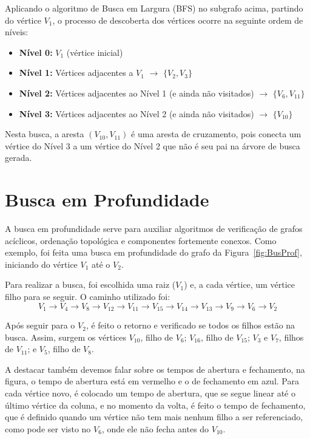 Aplicando o algoritmo de Busca em Largura (BFS) no subgrafo acima, partindo do vértice $V_1$, o processo de descoberta dos vértices ocorre na seguinte ordem de níveis:

\begin{itemize}
    \item \textbf{Nível 0:} $V_{1}$ (vértice inicial)
    \item \textbf{Nível 1:} Vértices adjacentes a $V_{1}$ $\rightarrow$ $\{V_{2}, V_{3}\}$
    \item \textbf{Nível 2:} Vértices adjacentes ao Nível 1 (e ainda não visitados) $\rightarrow$ $\{V_{6}, V_{11}\}$
    \item \textbf{Nível 3:} Vértices adjacentes ao Nível 2 (e ainda não visitados) $\rightarrow$ $\{V_{10}\}$
\end{itemize}

Nesta busca, a aresta $(V_{10}, V_{11})$ é uma aresta de cruzamento, pois conecta um vértice do Nível 3 a um vértice do Nível 2 que não é seu pai na árvore de busca gerada.


    \section{Busca em Profundidade}\label{sec:buscaProf}
A busca em profundidade serve para auxiliar algoritmos de verificação de grafos acíclicos, ordenação topológica e componentes fortemente conexos.
Como exemplo, foi feita uma busca em profundidade do grafo da Figura~\ref{fig:BusProf}, iniciando do vértice $V_1$ até o $V_2$.

Para realizar a busca, foi escolhida uma raiz ($V_1$) e, a cada vértice, um vértice filho para se seguir.
O caminho utilizado foi:
\[
V_1 \rightarrow V_4 \rightarrow V_8 \rightarrow V_{12} \rightarrow V_{11} \rightarrow V_{15} \rightarrow V_{14} \rightarrow V_{13} \rightarrow V_9 \rightarrow V_6 \rightarrow V_2
\]

Após seguir para o $V_2$, é feito o retorno e verificado se todos os filhos estão na busca. Assim, surgem os vértices $V_{10}$, filho de $V_6$; $V_{16}$, filho de $V_{15}$; $V_3$ e $V_7$, filhos de $V_{11}$; e $V_5$, filho de $V_8$.

A destacar também devemos falar sobre os tempos de abertura e fechamento, na figura, o tempo de abertura está em vermelho e o de fechamento em azul. Para cada vértice novo, é colocado um tempo de abertura, que se segue linear até o último vértice da coluna, e no momento da volta, é feito o tempo de fechamento, que é definido quando um vértice não tem mais nenhum filho a ser referenciado, como pode ser visto no  $V_6$, onde ele não fecha antes do $V_{10}$.

